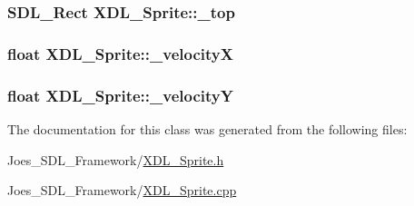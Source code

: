 \hypertarget{class_x_d_l___sprite_adbc4eb2f877c07dfd80701ee58575884}{
\subsubsection[{\-\_\-top}]{\setlength{\rightskip}{0pt plus 5cm}S\-D\-L\-\_\-\-Rect X\-D\-L\-\_\-\-Sprite\-::\-\_\-top\hspace{0.3cm}{\ttfamily [protected]}}}\label{class_x_d_l___sprite_adbc4eb2f877c07dfd80701ee58575884}
\hypertarget{class_x_d_l___sprite_a0a9c243d3f08c3ca76a9eee292e5b93d}{
\subsubsection[{\-\_\-velocity\-X}]{\setlength{\rightskip}{0pt plus 5cm}float X\-D\-L\-\_\-\-Sprite\-::\-\_\-velocity\-X\hspace{0.3cm}{\ttfamily [protected]}}}\label{class_x_d_l___sprite_a0a9c243d3f08c3ca76a9eee292e5b93d}
\hypertarget{class_x_d_l___sprite_a44accc22025bb3fd43ec6db2513417f0}{
\subsubsection[{\-\_\-velocity\-Y}]{\setlength{\rightskip}{0pt plus 5cm}float X\-D\-L\-\_\-\-Sprite\-::\-\_\-velocity\-Y\hspace{0.3cm}{\ttfamily [protected]}}}\label{class_x_d_l___sprite_a44accc22025bb3fd43ec6db2513417f0}


The documentation for this class was generated from the following files\-:\begin{DoxyCompactItemize}
\item 
Joes\-\_\-\-S\-D\-L\-\_\-\-Framework/\hyperlink{_x_d_l___sprite_8h}{X\-D\-L\-\_\-\-Sprite.\-h}\item 
Joes\-\_\-\-S\-D\-L\-\_\-\-Framework/\hyperlink{_x_d_l___sprite_8cpp}{X\-D\-L\-\_\-\-Sprite.\-cpp}\end{DoxyCompactItemize}
